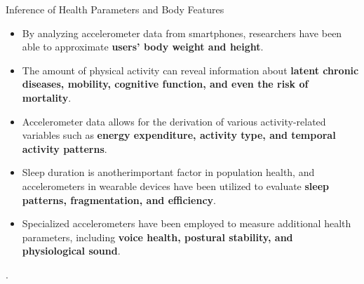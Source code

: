 \documentclass[ucs,9pt]{beamer}
\begin{document}
\begin{frame}{Inference of Health Parameters and Body Features}
\begin{itemize}
	\item By analyzing accelerometer data from smartphones, researchers have
	been able to approximate  \textbf{users’ body weight and height}.
	\item The amount of physical activity can reveal information about \textbf{latent chronic diseases, mobility, cognitive function, and even the risk of mortality}.
	\item Accelerometer data allows for the derivation of various
	activity-related variables such as \textbf{energy expenditure, activity type, and temporal activity patterns}.
	\item Sleep duration is anotherimportant factor in population health, and accelerometers in	wearable devices have been utilized to evaluate \textbf{sleep patterns, fragmentation, and efficiency}. 
	\item Specialized accelerometers have been employed to measure additional health parameters, including \textbf{voice health, postural stability, and physiological sound}. 
\end{itemize}.
\end{frame}
\end{document}
